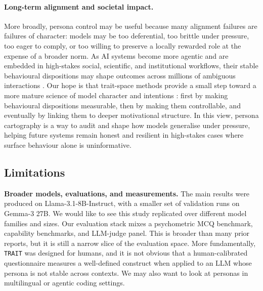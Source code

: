 
\paragraph{Long-term alignment and societal impact.}
More broadly, persona control may be useful because many alignment failures are failures of character: models may be too deferential, too brittle under pressure, too eager to comply, or too willing to preserve a locally rewarded role at the expense of a broader norm. As AI systems become more agentic and are embedded in high-stakes social, scientific, and institutional workflows, their stable behavioural dispositions may shape outcomes across millions of ambiguous interactions
\citep{macaskill2026importance,huang2025valueswilddiscoveringanalyzing}. Our hope is that trait-space methods provide a small step toward a more mature science of model
character and intentions \citep{marks2026persona,africa2026personas}: first by making behavioural dispositions measurable, then by making them controllable, and eventually by linking them to deeper motivational structure. In this view, persona cartography is a way to audit and shape how models generalise under pressure, helping future systems remain honest and resilient in high-stakes cases where surface behaviour alone is uninformative.

\subsection{Limitations}\label{sec:limitations}

\textbf{Broader models, evaluations, and measurements.} The main results were produced on Llama-3.1-8B-Instruct, with a smaller set of validation runs on Gemma-3 27B. We would like to see this study replicated over different model families and sizes. Our evaluation stack mixes a psychometric MCQ benchmark, capability benchmarks, and LLM-judge panel. This is broader than many prior reports, but it is still a narrow slice of the evaluation space. More fundamentally, \texttt{TRAIT} was designed for humans, and it is not obvious that a human-calibrated questionnaire measures a well-defined construct when applied to an LLM whose persona is not stable across contexts. We may also want to look at personas in multilingual or agentic coding settings.

